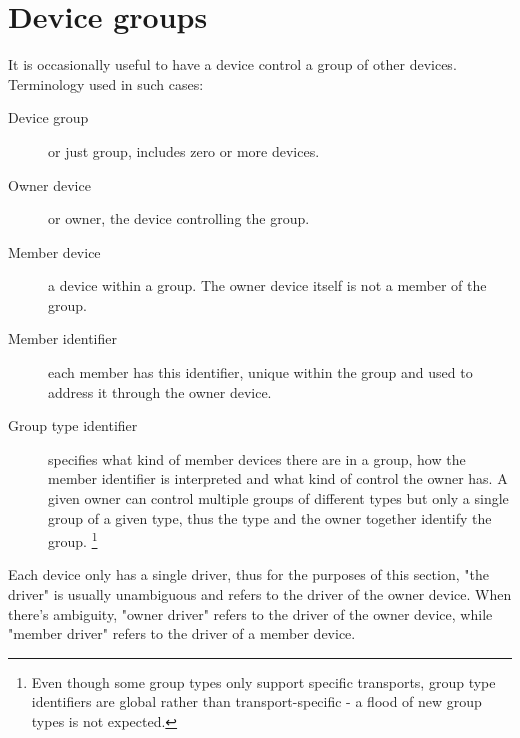 \section{Device groups}\label{sec:Basic Facilities of a Virtio Device / Device groups}

It is occasionally useful to have a device control a group of
other devices. Terminology used in such cases:

\begin{description}
\item[Device group]
        or just group, includes zero or more devices.
\item[Owner device]
        or owner, the device controlling the group.
\item[Member device]
        a device within a group. The owner device itself is not
	a member of the group.
\item[Member identifier]
        each member has this identifier, unique within the group
	and used to address it through the owner device.
\item[Group type identifier]
	specifies what kind of member devices there are in a
	group, how the member identifier is interpreted
	and what kind of control the owner has.
	A given owner can control multiple groups
	of different types but only a single group of a given type,
	thus the type and the owner together identify the group.
	\footnote{Even though some group types only support
			specific transports, group type identifiers
			are global rather than transport-specific -
			a flood of new group types is not expected.}
\end{description}

\begin{note}
Each device only has a single driver, thus for the purposes of
this section, "the driver" is usually unambiguous and refers to
the driver of the owner device.  When there's ambiguity, "owner
driver" refers to the driver of the owner device, while "member
driver" refers to the driver of a member device.
\end{note}

